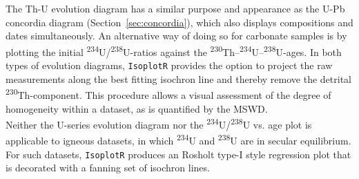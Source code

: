 \begin{refsection}
The Th-U evolution diagram has a similar purpose and appearance as the
U-Pb concordia diagram (Section~\ref{sec:concordia}), which also
displays compositions and dates simultaneously. An alternative way of
doing so for carbonate samples is by plotting the initial
\textsuperscript{234}U/\textsuperscript{238}U-ratios against the
\textsuperscript{230}Th--\textsuperscript{234}U--\textsuperscript{238}U-ages.
In both types of evolution diagrams, \texttt{IsoplotR} provides the
option to project the raw measurements along the best fitting isochron
line and thereby remove the detrital
\textsuperscript{230}Th-component. This procedure allows a visual
assessment of the degree of homogeneity within a dataset, as is
quantified by the MSWD.\\

Neither the U-series evolution diagram nor the
\textsuperscript{234}U/\textsuperscript{238}U vs. age plot is
applicable to igneous datasets, in which \textsuperscript{234}U and
\textsuperscript{238}U are in secular equilibrium.  For such datasets,
\texttt{IsoplotR} produces an Rosholt type-I style regression plot
that is decorated with a fanning set of isochron lines.


\end{refsection}
